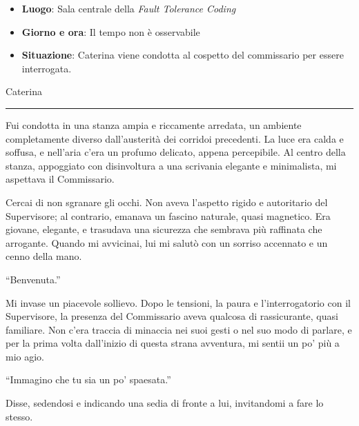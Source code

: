 
\begin{tcolorbox}[colback=gray!5,colframe=gray!80,title=\textbf{Scheda Informativa}]
\begin{itemize}
    \item \textbf{Luogo}: Sala centrale della \emph{Fault Tolerance Coding}
    \item \textbf{Giorno e ora}: Il tempo non è osservabile
    \item \textbf{Situazione}: Caterina viene condotta al cospetto del commissario per essere interrogata.
\end{itemize}
\end{tcolorbox}

\vspace{1em}
\begin{center}Caterina\end{center}
\hrule
\vspace{1em}


Fui condotta in una stanza ampia e riccamente arredata, un ambiente completamente diverso dall'austerità dei corridoi precedenti. La luce era calda e soffusa, e nell'aria c'era un profumo delicato, appena percepibile. Al centro della stanza, appoggiato con disinvoltura a una scrivania elegante e minimalista, mi aspettava il Commissario.

Cercai di non sgranare gli occhi. Non aveva l'aspetto rigido e autoritario del Supervisore; al contrario, emanava un fascino naturale, quasi magnetico. Era giovane, elegante, e trasudava una sicurezza che sembrava più raffinata che arrogante. Quando mi avvicinai, lui mi salutò con un sorriso accennato e un cenno della mano.

\begin{dialogue}
 \enquote{Benvenuta.}
\end{dialogue}

Mi invase un piacevole sollievo. Dopo le tensioni, la paura e l'interrogatorio con il Supervisore, la presenza del Commissario aveva qualcosa di rassicurante, quasi familiare. Non c'era traccia di minaccia nei suoi gesti o nel suo modo di parlare, e per la prima volta dall'inizio di questa strana avventura, mi sentii un po' più a mio agio.

\begin{dialogue}
 \enquote{Immagino che tu sia un po' spaesata.}
\end{dialogue}

Disse, sedendosi e indicando una sedia di fronte a lui, invitandomi a fare lo stesso.

